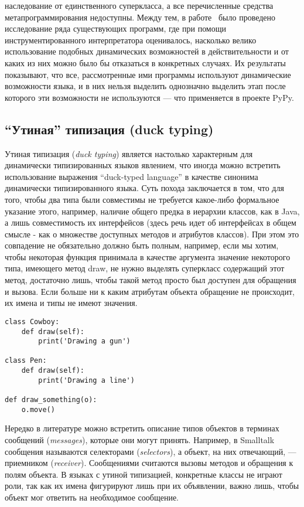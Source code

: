 \begin{itemize}
{      наследование от единственного суперкласса, а все перечисленные средства
      метапрограммирования недоступны.  Между тем, в работе~\cite{Holkner2009} было проведено
      исследование ряда существующих программ, где при помощи инструментированного
      интерпретатора оценивалось, насколько велико использование подобных
      динамических возможностей в действительности и от каких из них можно было бы
      отказаться в конкретных случаях. Их результаты показывают, что все,
      рассмотренные ими программы используют динамические возможности языка, и в них
      нельзя выделить однозначно выделить этап после которого эти возможности не
      используются --- что применяется в проекте PyPy.
    }
\end{itemize}

\subsection{``Утиная'' типизация (duck typing)}

Утиная типизация (\emph{duck typing}) является настолько характерным для динамически
типизированных языков явлением, что иногда можно встретить использование
выражения ``duck-typed language'' в качестве синонима динамически типизированного
языка.  Суть похода заключается в том, что для того, чтобы два типа были
совместимы не требуется какое-либо формальное указание этого, например, наличие
общего предка в иерархии классов, как в Java, а лишь совместимость их
интерфейсов (здесь речь идет об интерфейсах в общем смысле - как о множестве
доступных методов и атрибутов классов). При этом это совпадение не обязательно
должно быть полным, например, если мы хотим, чтобы некоторая функция принимала
в качестве аргумента значение некоторого типа, имеющего метод draw, не нужно
выделять суперкласс содержащий этот метод, достаточно лишь, чтобы такой метод
просто был доступен для обращения и вызова. Если больше ни к каким атрибутам
объекта обращение не происходит, их имена и типы не имеют значения.

\pagebreak
\begin{lstlisting}
class Cowboy:
    def draw(self):
        print('Drawing a gun')

class Pen:
    def draw(self):
        print('Drawing a line')

def draw_something(o):
    o.move()
\end{lstlisting}

Нередко в литературе можно встретить описание типов объектов в терминах
сообщений (\emph{messages}), которые они могут принять. Например, в Smalltalk
сообщения называются селекторами (\emph{selectors}), а объект, на них отвечающий, ---
приемником (\emph{receiver}). Сообщениями считаются вызовы методов и обращения к полям
объекта. В языках с утиной типизацией, конкретные классы не играют роли, так
как их имена фигурируют лишь при их объявлении, важно лишь, чтобы объект мог
ответить на необходимое сообщение.  

